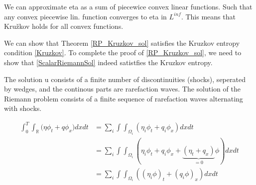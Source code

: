 \documentclass{article}
\numberwithin{equation}{section}
\begin{document}
 We can approximate eta as a sum of piecewice convex linear functions. Such that any convex piecewise lin. function converges to eta in $L^{inf}$. This means that Kružkov holds for all convex functions. 

We can show that Theorem \ref{RP_Kruzkov_sol} satisfies the Kruzkov entropy condition \ref{Kruzkov}. 
To complete the proof of \ref{RP_Kruzkov_sol}, we need to show that \ref{ScalarRiemannSol} indeed satistfies the Kruzkov entropy. 

The solution u consists of a finite number of discontinuities (shocks), seperated by wedges, and the continous parts are rarefaction waves. The solution of the Riemann problem consists of a finite sequence of rarefaction waves alternating with shocks.

\begin{equation}
    \begin{split}
        \int_0^T \int_{\mathbb{R}} \big ( \eta \phi_t + q\phi_x\big ) dx dt &=  \sum_i \int \int_{\Omega_i}(\eta_i\phi_t + q_i\phi_x)dxdt \\
        &=  \sum_i \int \int_{\Omega_i}(\eta_i\phi_t + q_i\phi_x + \underbrace{(\eta_t + q_x)}_{=0}\phi )dxdt \\ &= \sum_i\int \int_{\Omega_i}( (\eta_i \phi)_t + (q_i \phi)_x )dxdt 
    \end{split}
\end{equation}
\end{document}
